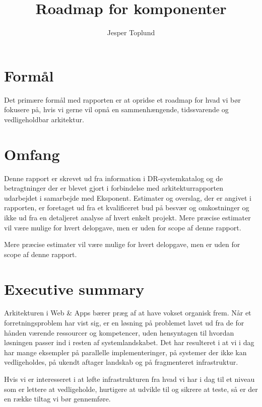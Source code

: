 \documentclass{article}
\author {Jesper Toplund}
\title{Roadmap for komponenter}
\date{}
\begin{document}
\maketitle

\vspace{20 mm}
\begin{quote}
    \textit{}
\end{quote}

\section{Formål}
Det primære formål med rapporten er at opridse et roadmap for hvad vi bør fokusere på, hvis vi gerne vil opnå en sammenhængende, tidssvarende og vedligeholdbar arkitektur.

\section{Omfang}
Denne rapport er skrevet ud fra information i DR-systemkatalog og de betragtninger der er blevet gjort i forbindelse med arkitekturrapporten udarbejdet i samarbejde med Eksponent. Estimater og overslag, der er angivet i rapporten, er foretaget ud fra et kvalificeret bud på besvær og omkostninger og ikke ud fra en detaljeret analyse af hvert enkelt projekt. Mere præcise estimater vil være mulige for hvert delopgave, men er uden for scope af denne rapport.
 
Mere præcise estimater vil være mulige for hvert delopgave, men er uden for scope af denne rapport.

\section{Executive summary}
Arkitekturen i Web \& Apps bærer præg af at have vokset organisk frem. Når et forretningsproblem har vist sig, er en løsning på problemet lavet ud fra de for hånden værende ressourcer og kompetencer, uden hensyntagen til hvordan løsningen passer ind i resten af systemlandskabet. Det har resulteret i at vi i dag har mange eksempler på parallelle implementeringer, på systemer der ikke kan vedligeholdes, på ukendt aftager landskab og på fragmenteret infrastruktur.

Hvis vi er interesseret i at løfte infrastrukturen fra hvad vi har i dag til et niveau som er lettere at vedligeholde, hurtigere at udvikle til og sikrere at teste, så er der en række tiltag vi bør gennemføre.
\end{document}
